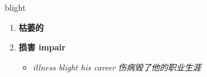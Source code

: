 
\begin{frame}
{\huge blight}
\begin{center}
\begin{enumerate}\Large
  \item \textbf{枯萎的}
  \item \textbf{损害 impair}
  \begin{itemize}
    \item \em{\Large{illness blight his career 伤病毁了他的职业生涯}}
  \end{itemize}
\end{enumerate}
\end{center}
\end{frame}

